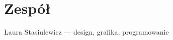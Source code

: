 \documentclass[a4paper]{scrreprt}
\begin{document}





\chapter{Zespół}
Laura Stasiulewicz — design, grafika, programowanie



%
%
\end{document}
